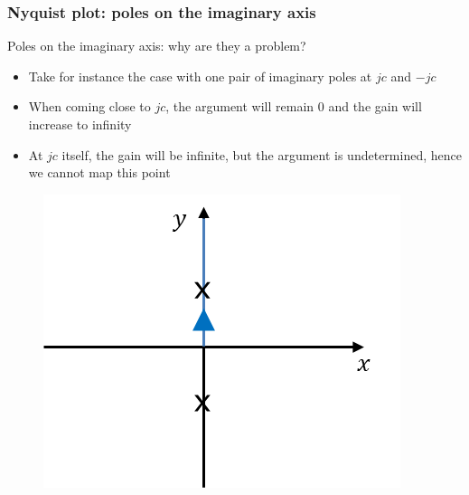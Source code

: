 \begin{frame}
	\frametitle{Nyquist plot: poles on the imaginary axis}
	Poles on the imaginary axis: why are they a problem?
	\begin{itemize}
		\item Take for instance the case with one pair of imaginary poles at $jc$ and $-jc$
		\item When coming close to $jc$, the argument will remain 0 and the gain will increase to infinity
		\item At $jc$ itself, the gain will be infinite, but the argument is undetermined, hence we cannot map this point
	\end{itemize}
	\begin{figure}
		\includegraphics[width=0.35\linewidth]{imaginary_axis}
	\end{figure}
\end{frame}

